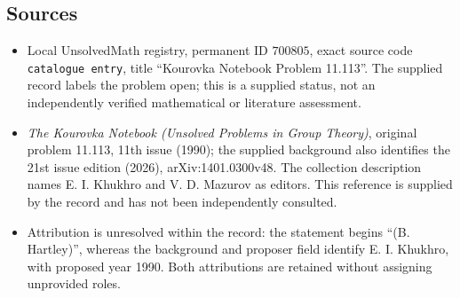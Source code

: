 \documentclass[11pt]{article}
\begin{document}
\subsection{Sources}
\begin{itemize}
\item Local UnsolvedMath registry, permanent ID \(700805\), exact source code \texttt{catalogue entry}, title ``Kourovka Notebook Problem 11.113''. The supplied record labels the problem open; this is a supplied status, not an independently verified mathematical or literature assessment.
\item \emph{The Kourovka Notebook (Unsolved Problems in Group Theory)}, original problem 11.113, 11th issue (1990); the supplied background also identifies the 21st issue edition (2026), arXiv:1401.0300v48. The collection description names E. I. Khukhro and V. D. Mazurov as editors. This reference is supplied by the record and has not been independently consulted.
\item Attribution is unresolved within the record: the statement begins ``(B. Hartley)'', whereas the background and proposer field identify E. I. Khukhro, with proposed year 1990. Both attributions are retained without assigning unprovided roles.
\end{itemize}
\end{document}
